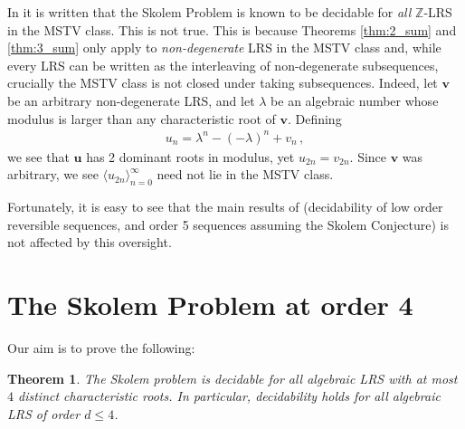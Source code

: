 \documentclass{article}\usepackage[a4paper,margin=20mm]{geometry}
\newtheorem{theorem}{Theorem}\newtheorem{lemma}[theorem]{Lemma}\newtheorem{proposition}[theorem]{Proposition}\newtheorem{corollary}[theorem]{Corollary}\newtheorem{definition}[theorem]{Definition}\newtheorem{claim}[theorem]{Claim}\newtheorem{remark}[theorem]{Remark}\newtheorem{observation}[theorem]{Observation}\newtheorem{conjecture}[theorem]{Conjecture}\newtheorem{example}[theorem]{Example}
\newcommand{\Z}{\mathbb{Z}}
\newcommand{\LRS}[1]{{\bm{#1}}}
\begin{document}
In \cite{Lipton_2022} it is written that the Skolem Problem is known to be decidable for \emph{all} $\Z$-LRS in the MSTV class. This is not true. This is because Theorems \ref{thm:2_sum} and \ref{thm:3_sum} only apply to \emph{non-degenerate} LRS in the MSTV class and, while every LRS can be written as the interleaving of non-degenerate subsequences, crucially the MSTV class is not closed under taking subsequences. Indeed, let $\LRS{v}$ be an arbitrary non-degenerate LRS, and let $\lambda$ be an algebraic number whose modulus is larger than any characteristic root of $\LRS{v}$. Defining 
\begin{align*}
    u_n = \lambda^n - (-\lambda)^n + v_n \, ,
\end{align*}
we see that $\LRS{u}$ has 2 dominant roots in modulus, yet $u_{2n} = v_{2n}$. Since $\LRS{v}$ was arbitrary, we see $\langle u_{2n} \rangle_{n=0}^\infty$ need not lie in the MSTV class.

Fortunately, it is easy to see that the main results of \cite{Lipton_2022} (decidability of low order reversible sequences, and order 5 sequences assuming the Skolem Conjecture) is not affected by this oversight.

\section{The Skolem Problem at order 4}
Our aim is to prove the following:

\begin{theorem} \label{MainThm}
	The Skolem problem is decidable for all algebraic LRS with at most $4$ distinct characteristic roots. In particular, decidability holds for all algebraic LRS of order $d \leq 4$.
\end{theorem}
\end{document}
